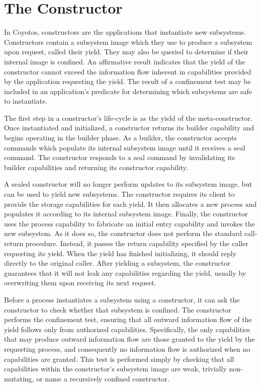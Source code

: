 \section{The Constructor}
\label{sect:constructor:constructor}

In Coyotos, constructors are the applications that instantiate new subsystems.
Constructors contain a subsystem image which they use to produce a subsystem upon request, called their yield.
They may also be queried to determine if their internal image is confined.
An affirmative result indicates that the yield of the constructor cannot exceed the information flow inherent in capabilities provided by the application requesting the yield.
The result of a confinement test may be included in an application's predicate for determining which subsystems are safe to instantiate.

The first step in a constructor's life-cycle is as the yield of the meta-constructor.
Once instantiated and initialized, a constructor returns its builder capability and begins operating in the builder phase.
As a builder, the constructor accepts commands which populate its internal subsystem image until it receives a seal command.
The constructor responds to a seal command by invalidating its builder capabilities and returning its constructor capability.

A sealed constructor will no longer perform updates to its subsystem image, but can be used to yield new subsystems.
The constructor requires its client to provide the storage capabilities for each yield.
It then allocates a new process and populates it according to its internal subsystem image.
Finally, the constructor uses the process capability to fabricate an initial entry capability and invokes the new subsystem.
As it does so, the constructor does not perform the standard call-return procedure.
Instead, it passes the return capability specified by the caller requesting its yield.
When the yield has finished initializing, it should reply directly to the original caller.
After yielding a subsystem, the constructor guarantees that it will not leak any capabilities regarding the yield, usually by overwriting them upon receiving its next request.

Before a process instantiates a subsystem using a constructor, it can ask the constructor to check whether that subsystem is confined.
The constructor performs the confinement test, ensuring that all outward information flow of the yield follows only from authorized capabilities.
Specifically, the only capabilities that may produce outward information flow are those granted to the yield by the requesting process, and consequently no information flow is authorized when no capabilities are granted.
This test is performed simply by checking that all capabilities within the constructor's subsystem image are weak, trivially non-mutating, or name a recursively confined constructor.


